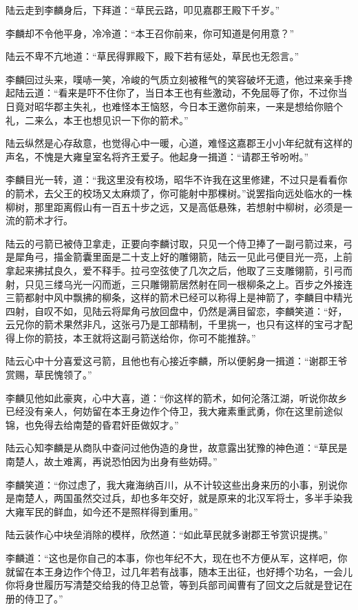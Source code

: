 陆云走到李麟身后，下拜道：“草民云路，叩见嘉郡王殿下千岁。”

李麟却不令他平身，冷冷道：“本王召你前来，你可知道是何用意？”

陆云不卑不亢地道：“草民得罪殿下，殿下若有惩处，草民也无怨言。”

李麟回过头来，噗哧一笑，冷峻的气质立刻被稚气的笑容破坏无遗，他过来亲手搀起陆云道：“看来是吓不住你了，当日本王也有些激动，不免屈辱了你，不过你当日竟对昭华郡主失礼，也难怪本王恼怒，今日本王邀你前来，一来是想给你赔个礼，二来么，本王也想见识一下你的箭术。”

陆云纵然是心存敌意，也觉得心中一暖，心道，难怪这嘉郡王小小年纪就有这样的声名，不愧是大雍皇室名将齐王爱子。他起身一揖道：“请郡王爷吩咐。”

李麟目光一转，道：“我这里没有校场，昭华不许我在这里修建，不过只是看看你的箭术，去父王的校场又太麻烦了，你可能射中那棵树。”说罢指向远处临水的一株柳树，那里距离假山有一百五十步之远，又是高低悬殊，若想射中柳树，必须是一流的箭术才行。

陆云的弓箭已被侍卫拿走，正要向李麟讨取，只见一个侍卫捧了一副弓箭过来，弓是犀角弓，描金箭囊里面是二十支上好的雕翎箭，陆云一见此弓便目光一亮，上前拿起来拂拭良久，爱不释手。拉弓空弦使了几次之后，他取了三支雕翎箭，引弓而射，只见三缕乌光一闪而逝，三只雕翎箭居然射在同一根柳条之上。百步之外接连三箭都射中风中飘拂的柳条，这样的箭术已经可以称得上是神箭了，李麟目中精光四射，自叹不如，见陆云将犀角弓放回盘中，仍然是满目留恋，李麟笑道：“好，云兄你的箭术果然非凡，这张弓乃是工部精制，千里挑一，也只有这样的宝弓才配得上你的箭技，本王就将这副弓箭送给你，你可不能推辞。”

陆云心中十分喜爱这弓箭，且他也有心接近李麟，所以便躬身一揖道：“谢郡王爷赏赐，草民愧领了。”

李麟见他如此豪爽，心中大喜，道：“你这样的箭术，如何沦落江湖，听说你故乡已经没有亲人，何妨留在本王身边作个侍卫，我大雍素重武勇，你在这里前途似锦，也免得去给南楚的昏君奸臣做奴才。”

陆云心知李麟是从商队中查问过他伪造的身世，故意露出犹豫的神色道：“草民是南楚人，故土难离，再说恐怕因为出身有些妨碍。”

李麟笑道：“你过虑了，我大雍海纳百川，从不计较这些出身来历的小事，别说你是南楚人，两国虽然交过兵，却也多年交好，就是原来的北汉军将士，多半手染我大雍军民的鲜血，如今还不是照样得到重用。”

陆云装作心中块垒消除的模样，欣然道：“如此草民就多谢郡王爷赏识提携。”

李麟道：“这也是你自己的本事，你也年纪不大，现在也不方便从军，这样吧，你就留在本王身边作个侍卫，过几年若有战事，随本王出征，也好搏个功名，一会儿你将身世履历写清楚交给我的侍卫总管，等到兵部司闻曹有了回文之后就是登记在册的侍卫了。”

